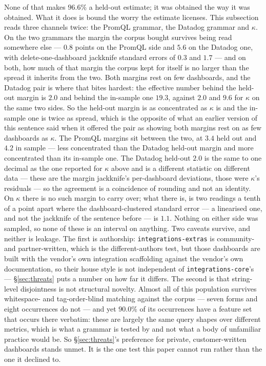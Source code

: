 None of that makes $96.6\%$ a held-out estimate; it was obtained the way it was obtained.
What it does is bound the worry the estimate licenses. This subsection reads three
channels twice: the PromQL grammar, the Datadog grammar and $\kappa$. On the two
grammars the margin the corpus bought survives being read somewhere else --- $0.8$
points on the PromQL side and $5.6$ on the Datadog one, with delete-one-dashboard
jackknife standard errors of $0.3$ and $1.7$ --- and on both, how much of that margin the
corpus kept for itself is no larger than the spread it inherits from the two. Both
margins rest on few dashboards, and the Datadog pair is where that bites hardest: the
effective number behind the held-out margin is $2.0$ and behind the in-sample one
$19.3$, against $2.0$ and $9.6$ for $\kappa$ on the same two sides. So the held-out
margin is as concentrated as $\kappa$ is and the in-sample one is twice as spread, which
is the opposite of what an earlier version of this sentence said when it offered the
pair as showing both margins rest on as few dashboards as $\kappa$. The PromQL
margins sit between the two, at $3.4$ held out and $4.2$ in sample --- less
concentrated than the Datadog held-out margin and more concentrated than its in-sample
one. The
Datadog held-out $2.0$ is the same to one decimal as the one reported for $\kappa$
above and is a different statistic on different data --- these are the margin jackknife's per-dashboard deviations, those
were $\kappa$'s residuals --- so the agreement is a coincidence of rounding and not an
identity. On $\kappa$ there is no such margin to carry over; what
there is, is two readings a tenth of a point apart where the dashboard-clustered
standard error --- a linearised one, and not the jackknife of the sentence before --- is
$1.1$. Nothing on either side was sampled, so none of these is an interval on
anything. Two caveats survive, and neither
is leakage.
The first is authorship: \texttt{integrations-extras} is community- and partner-written,
which is the different-authors test, but those dashboards are built with the vendor's own
integration scaffolding against the vendor's own documentation, so their house style is
not independent of \texttt{integrations-core}'s --- \S\ref{sec:threats} puts a number on
how far it differs. The second is that string-level disjointness is not structural
novelty. Almost all of this population survives whitespace- and tag-order-blind matching
against the corpus --- seven forms and eight occurrences do not --- and yet $90.0\%$ of
its occurrences have a feature set that occurs there verbatim: these are largely the same query shapes over different metrics,
which is what a grammar is tested by and not what a body of unfamiliar practice would
be. So \S\ref{sec:threats}'s preference for private, customer-written dashboards stands
unmet. It is the one test this paper cannot run rather than the one it declined to.

